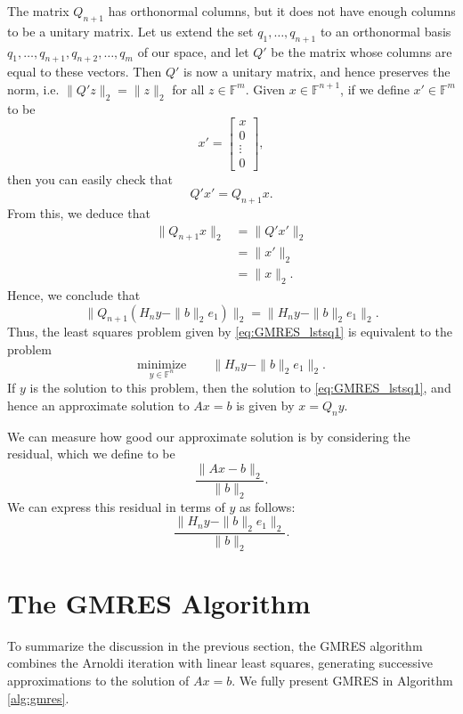 The matrix $Q_{n+1}$ has orthonormal columns, but it does not have enough columns to be a unitary matrix.
Let us extend the set $q_1,\ldots, q_{n+1}$ to an orthonormal basis $q_1,\ldots,q_{n+1},q_{n+2},\ldots,q_m$
of our space, and let $Q'$ be the matrix whose columns are equal to these vectors.
Then $Q'$ is now a unitary matrix, and hence preserves the norm, i.e. $\|Q'z\|_2 = \|z\|_2$ for all $z \in \mathbb{F}^m$.
Given $x \in \mathbb{F}^{n+1}$, if we define $x' \in \mathbb{F}^m$ to be
\[
x' =
\begin{bmatrix}
  x\\
  0\\
  \vdots\\
  0
\end{bmatrix},
\]
then you can easily check that
\[
Q'x' = Q_{n+1}x.
\]
From this, we deduce that
\begin{align*}
\|Q_{n+1}x\|_2 &= \|Q'x'\|_2\\
& = \|x'\|_2\\
&= \|x\|_2.
\end{align*}
Hence, we conclude that
\[
\|Q_{n+1}\left(H_n y - \|b\|_2e_1\right)\|_2 = \|H_n y - \|b\|_2e_1\|_2.
\]
Thus, the least squares problem given by \ref{eq:GMRES_lstsq1} is equivalent to the problem
\begin{equation}
\underset{y \in \mathbb{F}^n}{\text{minimize}}\qquad \|H_n y - \|b\|_2e_1\|_2.
\label{eq:GMRES_lstsq2}
\end{equation}
If $y$ is the solution to this problem, then the solution to \ref{eq:GMRES_lstsq1}, and hence an approximate
solution to $Ax = b$ is given by $x=Q_n y$.

We can measure how good our approximate solution is by considering the residual, which we define to be
\[
\frac{\|Ax-b\|_2}{\|b\|_2}.
\]
We can express this residual in terms of $y$ as follows:
\begin{equation}
\frac{\|H_n y - \|b\|_2e_1\|_2}{\|b\|_2}.
\label{eq:GMRES_residual}
\end{equation}
\section*{The GMRES Algorithm}
To summarize the discussion in the previous section, the GMRES algorithm combines the Arnoldi iteration with linear least squares,
generating successive approximations to the solution of $Ax = b$.
We fully present GMRES in Algorithm \ref{alg:gmres}.

